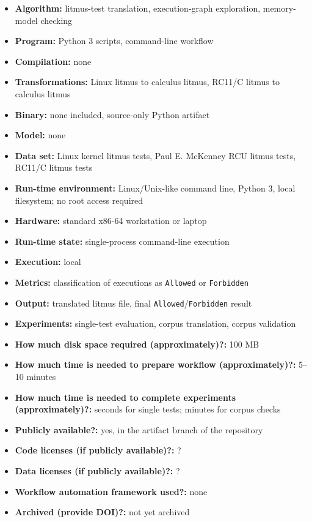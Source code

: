 \documentclass{sigplanconf}
\begin{document}
{\small
\begin{itemize}
  \item {\bf Algorithm: } litmus-test translation, execution-graph exploration, memory-model checking
  \item {\bf Program: } Python 3 scripts, command-line workflow
  \item {\bf Compilation: } none
  \item {\bf Transformations: } Linux litmus to calculus litmus, RC11/C litmus to calculus litmus
  \item {\bf Binary: } none included, source-only Python artifact
  \item {\bf Model: } none
  \item {\bf Data set: } Linux kernel litmus tests, Paul E. McKenney RCU litmus tests, RC11/C litmus tests
  \item {\bf Run-time environment: } Linux/Unix-like command line, Python 3, local filesystem; no root access required
  \item {\bf Hardware: } standard x86-64 workstation or laptop
  \item {\bf Run-time state: } single-process command-line execution
  \item {\bf Execution: } local
  \item {\bf Metrics: } classification of executions as \texttt{Allowed} or \texttt{Forbidden}
  \item {\bf Output: } translated litmus file, final \texttt{Allowed}/\texttt{Forbidden} result
  \item {\bf Experiments: } single-test evaluation, corpus translation, corpus validation
  \item {\bf How much disk space required (approximately)?: } 100 MB
  \item {\bf How much time is needed to prepare workflow (approximately)?: } 5--10 minutes
  \item {\bf How much time is needed to complete experiments (approximately)?: } seconds for single tests; minutes for corpus checks
  \item {\bf Publicly available?: } yes, in the artifact branch of the repository
  \item {\bf Code licenses (if publicly available)?: } ?
  \item {\bf Data licenses (if publicly available)?: } ?
  \item {\bf Workflow automation framework used?: } none
  \item {\bf Archived (provide DOI)?: } not yet archived
\end{itemize}
}
\end{document}
